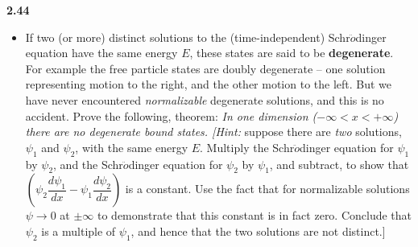 \documentclass[fleqn]{article}
\begin{document}
  \textbf{2.44}
  \begin{itemize}
    \item If two (or more) distinct solutions to the (time-independent) Schr$\ddot{o}$dinger equation have the
    same energy $E$, these states are said to be \textbf{degenerate}. For example the free particle states are 
    doubly degenerate -- one solution representing motion to the right, and the other motion to the left. But
    we have never encountered \emph{normalizable} degenerate solutions, and this is no accident. Prove the following,
    theorem: \emph{In one dimension ($-\infty < x < +\infty$) there are no degenerate bound states. [Hint:} suppose
    there are \emph{two} solutions, $\psi_1$ and $\psi_2$, with the same energy $E$. Multiply the Schr$\ddot{o}$dinger equation
    for $\psi_1$ by $\psi_2$, and the Schr$\ddot{o}$dinger equation for $\psi_2$ by $\psi_1$, and subtract,
    to show that $\left(\psi_2 \dfrac{d\psi_1}{dx}-\psi_1 \dfrac{d\psi_2}{dx}\right)$ is a constant. Use the 
    fact that for normalizable solutions $\psi \longrightarrow 0$ at $\pm \infty$ to demonstrate that this constant
    is in fact zero. Conclude that $\psi_2$ is a multiple of $\psi_1$, and hence that the two solutions
    are not distinct.]
  \end{itemize}
\end{document}
